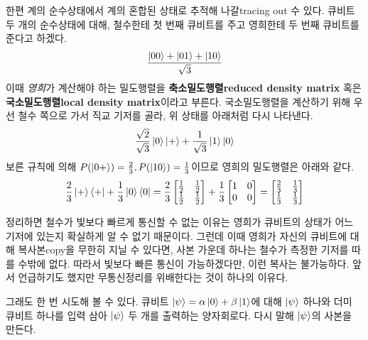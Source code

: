 \documentclass[a4paper,chapter,atbegshi]{oblivoir}
\begin{document}
한편 계의 순수상태에서 계의 혼합된 상태로 추적해 나갈{\tiny tracing out} 수
있다.  큐비트 두 개의 순수상태에 대해, 철수한테 첫 번째 큐비트를
주고 영희한테 두 번째 큐비트를 준다고 하겠다.
\[
  \frac{\ket{00}+\ket{01}+\ket{10}}{\sqrt3}
\]
이때 \emph{영희}가 계산해야 하는 밀도행렬을 \textbf{축소밀도행렬\tiny reduced density
matrix} 혹은 \textbf{국소밀도행렬\tiny local density matrix}이라고 부른다.
국소밀도행렬을 계산하기 위해 우선 철수 쪽으로 가서 직교 기저를 골라,
위 상태를 아래처럼 다시 나타낸다.
\[
  \frac{\sqrt2}{\sqrt3}\ket0\ket++\frac{1}{\sqrt3}\ket1\ket0
\]
보른 규칙에 의해 $P(\ket{0+})=\frac{2}{3}, P(\ket{10})=\frac{1}{3}$이므로
영희의 밀도행렬은 아래와 같다.
\[
  \frac{2}{3}\ket+\bra++\frac{1}{3}\ket0\bra0=\frac{2}{3}\begin{bmatrix}
  \frac{1}{2} &\frac{1}{2} \\ \frac{1}{2} &\frac{1}{2}\end{bmatrix}+
  \frac{1}{3}\begin{bmatrix}1&0\\0&0\end{bmatrix}=
  \begin{bmatrix}\frac{2}{3} &\frac{1}{3} \\ \frac{1}{3} &\frac{1}{3}\end{bmatrix}
\]

정리하면 철수가 빛보다 빠르게 통신할 수 없는 이유는 영희가 큐비트의 상태가
어느 기저에 있는지 확실하게 알 수 없기 때문이다. 그런데 이때 영희가 자신의
큐비트에 대해 복사본{\tiny copy}을 무한히 지닐 수 있다면, 사본 가운데 하나는
철수가 측정한 기저를 따를 수밖에 없다. 따라서 빛보다 빠른 통신이 가능하겠다만, 
이런 복사는 불가능하다. 앞서 언급하기도 했지만 무통신정리를 위배한다는
것이 하나의 이유다. 

그래도 한 번 시도해 볼 수 있다. 큐비트 $\ket{\psi}=\alpha\ket0+\beta\ket1$에
대해 $\ket{\psi}$ 하나와 더미 큐비트 하나를 입력 삼아 
$\ket{\psi}$ 두 개를 출력하는 양자회로다. 다시 말해 $\ket{\psi}$의 사본을 만든다.
\end{document}

